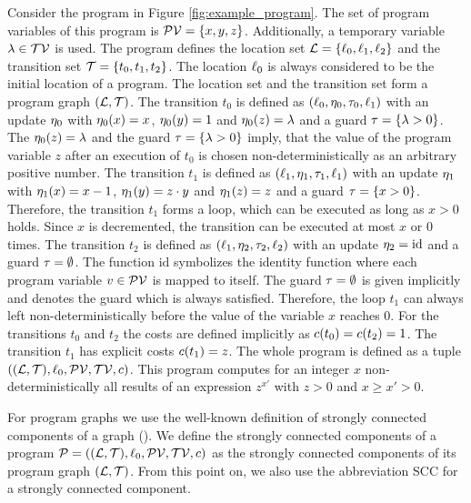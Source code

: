\begin{example}[Program]
  
  Consider the program in Figure \ref{fig:example_program}.
  The set of program variables of this program is $\mathcal{PV} = \lbrace x,y,z \rbrace$.
  Additionally, a temporary variable $\lambda \in \mathcal{TV}$ is used.
  The program defines the location set $\mathcal{L} = \lbrace \ell_0,\ell_1,\ell_2 \rbrace$ and the transition set $\mathcal{T} = \lbrace t_0,t_1,t_2 \rbrace$.
  The location $\ell_0$ is always considered to be the initial location of a program.
  The location set and the transition set form a program graph $(\mathcal{L}, \mathcal{T})$.
  The transition $t_0$ is defined as $(\ell_0,\eta_0,\tau_0,\ell_1)$ with an update $\eta_0$ with $\eta_0(x)=x$, $\eta_0(y)=1$ and $\eta_0(z)=\lambda$ and a guard $\tau = \lbrace \lambda > 0 \rbrace$.
  The $\eta_0(z)=\lambda$ and the guard $\tau = \lbrace \lambda > 0 \rbrace$ imply, that the value of the program variable $z$ after an execution of $t_0$ is chosen non-deterministically as an arbitrary positive number.
  The transition $t_1$ is defined as $(\ell_1,\eta_1,\tau_1,\ell_1)$ with an update $\eta_1$ with $\eta_1(x)=x-1$, $\eta_1(y)=z \cdot y$ and $\eta_1(z)=z$ and a guard $\tau = \lbrace x > 0 \rbrace$.
  Therefore, the transition $t_1$ forms a loop, which can be executed as long as $x > 0$ holds.
  Since $x$ is decremented, the transition can be executed at most $x$ or $0$ times.
  The transition $t_2$ is defined as $(\ell_1,\eta_2,\tau_2,\ell_2)$ with an update $\eta_2 = \text{id}$ and a guard $\tau = \emptyset$.
  The function $\text{id}$ symbolizes the identity function where each program variable $v \in \mathcal{PV}$ is mapped to itself.
  The guard $\tau = \emptyset$ is given implicitly and denotes the guard which is always satisfied.
  Therefore, the loop $t_1$ can always left non-deterministically before the value of the variable $x$ reaches $0$.
  For the transitions $t_0$ and $t_2$ the costs are defined implicitly as $c(t_0) = c(t_2) = 1$.
  The transition $t_1$ has explicit costs $c(t_1) = z$.
  The whole program is defined as a tuple $((\mathcal{L}, \mathcal{T}), \ell_0, \mathcal{PV}, \mathcal{TV}, c)$.
  This program computes for an integer $x$ non-deterministically all results of an expression $z^{x'}$ with $z > 0$ and $x \geq x' > 0$.  
\end{example}

For program graphs we use the well-known definition of strongly connected components of a graph (\cite{sccs}).
We define the strongly connected components of a program $\mathcal{P} = ((\mathcal{L}, \mathcal{T}), \ell_0, \mathcal{PV}, \mathcal{TV}, c)$ as the strongly connected components of its program graph $(\mathcal{L}, \mathcal{T})$.
From this point on, we also use the abbreviation SCC for a strongly connected component.

